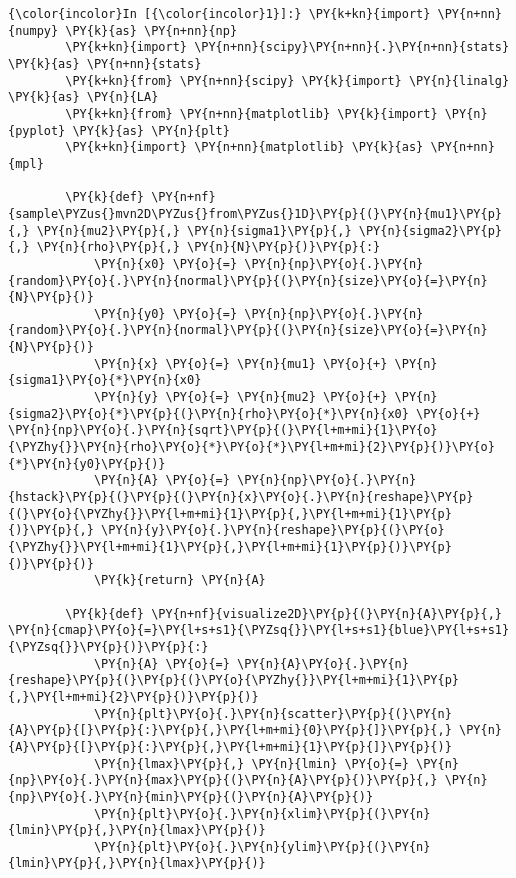     \begin{Verbatim}[commandchars=\\\{\}]
{\color{incolor}In [{\color{incolor}1}]:} \PY{k+kn}{import} \PY{n+nn}{numpy} \PY{k}{as} \PY{n+nn}{np}
        \PY{k+kn}{import} \PY{n+nn}{scipy}\PY{n+nn}{.}\PY{n+nn}{stats} \PY{k}{as} \PY{n+nn}{stats}
        \PY{k+kn}{from} \PY{n+nn}{scipy} \PY{k}{import} \PY{n}{linalg} \PY{k}{as} \PY{n}{LA}
        \PY{k+kn}{from} \PY{n+nn}{matplotlib} \PY{k}{import} \PY{n}{pyplot} \PY{k}{as} \PY{n}{plt}
        \PY{k+kn}{import} \PY{n+nn}{matplotlib} \PY{k}{as} \PY{n+nn}{mpl}
        
        \PY{k}{def} \PY{n+nf}{sample\PYZus{}mvn2D\PYZus{}from\PYZus{}1D}\PY{p}{(}\PY{n}{mu1}\PY{p}{,} \PY{n}{mu2}\PY{p}{,} \PY{n}{sigma1}\PY{p}{,} \PY{n}{sigma2}\PY{p}{,} \PY{n}{rho}\PY{p}{,} \PY{n}{N}\PY{p}{)}\PY{p}{:}
            \PY{n}{x0} \PY{o}{=} \PY{n}{np}\PY{o}{.}\PY{n}{random}\PY{o}{.}\PY{n}{normal}\PY{p}{(}\PY{n}{size}\PY{o}{=}\PY{n}{N}\PY{p}{)}
            \PY{n}{y0} \PY{o}{=} \PY{n}{np}\PY{o}{.}\PY{n}{random}\PY{o}{.}\PY{n}{normal}\PY{p}{(}\PY{n}{size}\PY{o}{=}\PY{n}{N}\PY{p}{)}
            \PY{n}{x} \PY{o}{=} \PY{n}{mu1} \PY{o}{+} \PY{n}{sigma1}\PY{o}{*}\PY{n}{x0}
            \PY{n}{y} \PY{o}{=} \PY{n}{mu2} \PY{o}{+} \PY{n}{sigma2}\PY{o}{*}\PY{p}{(}\PY{n}{rho}\PY{o}{*}\PY{n}{x0} \PY{o}{+} \PY{n}{np}\PY{o}{.}\PY{n}{sqrt}\PY{p}{(}\PY{l+m+mi}{1}\PY{o}{\PYZhy{}}\PY{n}{rho}\PY{o}{*}\PY{o}{*}\PY{l+m+mi}{2}\PY{p}{)}\PY{o}{*}\PY{n}{y0}\PY{p}{)}
            \PY{n}{A} \PY{o}{=} \PY{n}{np}\PY{o}{.}\PY{n}{hstack}\PY{p}{(}\PY{p}{(}\PY{n}{x}\PY{o}{.}\PY{n}{reshape}\PY{p}{(}\PY{o}{\PYZhy{}}\PY{l+m+mi}{1}\PY{p}{,}\PY{l+m+mi}{1}\PY{p}{)}\PY{p}{,} \PY{n}{y}\PY{o}{.}\PY{n}{reshape}\PY{p}{(}\PY{o}{\PYZhy{}}\PY{l+m+mi}{1}\PY{p}{,}\PY{l+m+mi}{1}\PY{p}{)}\PY{p}{)}\PY{p}{)}
            \PY{k}{return} \PY{n}{A}
        
        \PY{k}{def} \PY{n+nf}{visualize2D}\PY{p}{(}\PY{n}{A}\PY{p}{,} \PY{n}{cmap}\PY{o}{=}\PY{l+s+s1}{\PYZsq{}}\PY{l+s+s1}{blue}\PY{l+s+s1}{\PYZsq{}}\PY{p}{)}\PY{p}{:}
            \PY{n}{A} \PY{o}{=} \PY{n}{A}\PY{o}{.}\PY{n}{reshape}\PY{p}{(}\PY{p}{(}\PY{o}{\PYZhy{}}\PY{l+m+mi}{1}\PY{p}{,}\PY{l+m+mi}{2}\PY{p}{)}\PY{p}{)}
            \PY{n}{plt}\PY{o}{.}\PY{n}{scatter}\PY{p}{(}\PY{n}{A}\PY{p}{[}\PY{p}{:}\PY{p}{,}\PY{l+m+mi}{0}\PY{p}{]}\PY{p}{,} \PY{n}{A}\PY{p}{[}\PY{p}{:}\PY{p}{,}\PY{l+m+mi}{1}\PY{p}{]}\PY{p}{)}
            \PY{n}{lmax}\PY{p}{,} \PY{n}{lmin} \PY{o}{=} \PY{n}{np}\PY{o}{.}\PY{n}{max}\PY{p}{(}\PY{n}{A}\PY{p}{)}\PY{p}{,} \PY{n}{np}\PY{o}{.}\PY{n}{min}\PY{p}{(}\PY{n}{A}\PY{p}{)}
            \PY{n}{plt}\PY{o}{.}\PY{n}{xlim}\PY{p}{(}\PY{n}{lmin}\PY{p}{,}\PY{n}{lmax}\PY{p}{)}
            \PY{n}{plt}\PY{o}{.}\PY{n}{ylim}\PY{p}{(}\PY{n}{lmin}\PY{p}{,}\PY{n}{lmax}\PY{p}{)}
        

\end{Verbatim}
